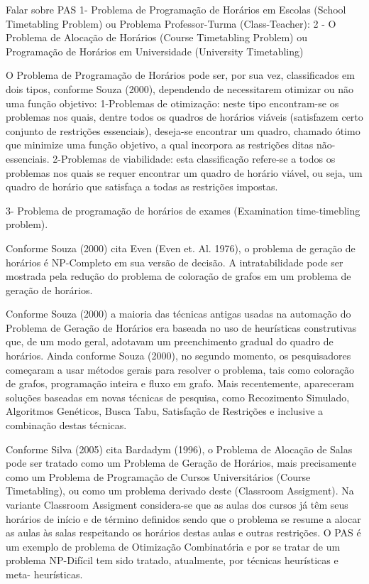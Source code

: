 \documentclass{abntpuc}
\begin{document}
%
%
%



Falar sobre PAS
1- Problema de Programação de Horários em Escolas (School Timetabling Problem) ou Problema Professor-Turma (Class-Teacher):
2 - O Problema de Alocação de Horários (Course Timetabling Problem) ou Programação de Horários em Universidade (University Timetabling) 

O Problema de Programação de Horários pode ser, por sua vez, classificados em
dois tipos, conforme Souza (2000), dependendo de necessitarem otimizar ou não uma
função objetivo:
1-Problemas de otimização: neste tipo encontram-se os problemas nos quais, dentre
todos os quadros de horários viáveis (satisfazem certo conjunto de restrições essenciais),
deseja-se encontrar um quadro, chamado ótimo que minimize uma função objetivo, a qual
incorpora as restrições ditas não-essenciais.
2-Problemas de viabilidade: esta classificação refere-se a todos os problemas nos
quais se requer encontrar um quadro de horário viável, ou seja, um quadro de horário que
satisfaça a todas as restrições impostas.



3- Problema de programação de horários de exames (Examination time-timebling problem).


Conforme Souza (2000) cita Even (Even et. Al. 1976), o problema de geração de
horários é NP-Completo em sua versão de decisão. A intratabilidade pode ser mostrada
pela redução do problema de coloração de grafos em um problema de geração de horários.

Conforme Souza (2000) a maioria das técnicas antigas usadas na automação do
Problema de Geração de Horários era baseada no uso de heurísticas construtivas que, de
um modo geral, adotavam um preenchimento gradual do quadro de horários. Ainda
conforme Souza (2000), no segundo momento, os pesquisadores começaram a usar
métodos gerais para resolver o problema, tais como coloração de grafos, programação
inteira e fluxo em grafo. Mais recentemente, apareceram soluções baseadas em novas
técnicas de pesquisa, como Recozimento Simulado, Algoritmos Genéticos, Busca Tabu,
Satisfação de Restrições e inclusive a combinação destas técnicas.

Conforme Silva (2005) cita Bardadym (1996), o Problema de Alocação de Salas
pode ser tratado como um Problema de Geração de Horários, mais precisamente como um
Problema de Programação de Cursos Universitários (Course Timetabling), ou como um
problema derivado deste (Classroom Assigment). Na variante Classroom Assigment
considera-se que as aulas dos cursos já têm seus horários de início e de término definidos
sendo que o problema se resume a alocar as aulas às salas respeitando os horários destas
aulas e outras restrições.
O PAS é um exemplo de problema de Otimização Combinatória e por se tratar de
um problema NP-Difícil tem sido tratado, atualmente, por técnicas heurísticas e meta-
heurísticas.
\end{document}
